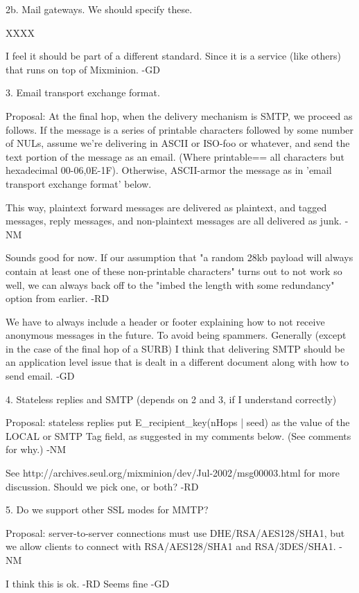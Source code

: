 2b. Mail gateways. We should specify these.

   XXXX

   I feel it should be part of a different standard. Since it is a
   service (like others) that runs on top of Mixminion. -GD

3. Email transport exchange format.

   Proposal: At the final hop, when the delivery mechanism is SMTP, we
   proceed as follows.  If the message is a series of printable
   characters followed by some number of NULs, assume we're
   delivering in ASCII or ISO-foo or whatever, and send the text
   portion of the message as an email.   (Where printable==
   {all characters but hexadecimal 00-06,0E-1F}).  Otherwise,
   ASCII-armor the message as in 'email transport exchange format'
   below.

   This way, plaintext forward messages are delivered as plaintext,
   and tagged messages, reply messages, and non-plaintext messages are
   all delivered as junk. -NM

   Sounds good for now. If our assumption that "a random 28kb payload
   will always contain at least one of these non-printable characters"
   turns out to not work so well, we can always back off to the "imbed
   the length with some redundancy" option from earlier. -RD

   We have to always include a header or footer explaining how to not
   receive anonymous messages in the future. To avoid being
   spammers. Generally (except in the case of the final hop of a SURB)
   I think that delivering SMTP should be an application level issue
   that is dealt in a different document along with how to send
   email. -GD

4. Stateless replies and SMTP (depends on 2 and 3, if I understand correctly)

   Proposal: stateless replies put E_recipient_key(nHops | seed) as
   the value of the LOCAL or SMTP Tag field, as suggested in my
   comments below.  (See comments for why.) -NM

   See http://archives.seul.org/mixminion/dev/Jul-2002/msg00003.html
   for more discussion. Should we pick one, or both? -RD

5. Do we support other SSL modes for MMTP?

   Proposal: server-to-server connections must use DHE/RSA/AES128/SHA1, 
   but we allow clients to connect with RSA/AES128/SHA1 and
   RSA/3DES/SHA1.  -NM

   I think this is ok. -RD
   Seems fine -GD
   
